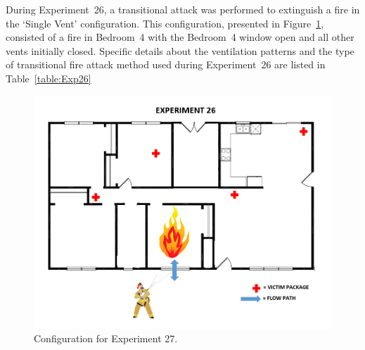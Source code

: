 \documentclass[12pt,oneside]{book}
\begin{document}
During Experiment~26, a transitional attack was performed to extinguish a fire in the `Single Vent' configuration. This configuration, presented in Figure~\ref{fig:Single_Vent_ext_alt2}, consisted of a fire in Bedroom~4 with the Bedroom~4 window open and all other vents initially closed. Specific details about the ventilation patterns and the type of transitional fire attack method used during Experiment~26 are listed in Table~\ref{table:Exp26}


\begin{figure}[H]
	\centering
	\includegraphics[width=5in]{Figures/General/Exp27.png}
	\caption{Configuration for Experiment 27.}
	\label{fig:Single_Vent_ext_alt2}
\end{figure}

\begin{table}[H]
\caption{Experiment 26}
\centering
{}
\label{table:Exp26}
\end{table}
\end{document}
